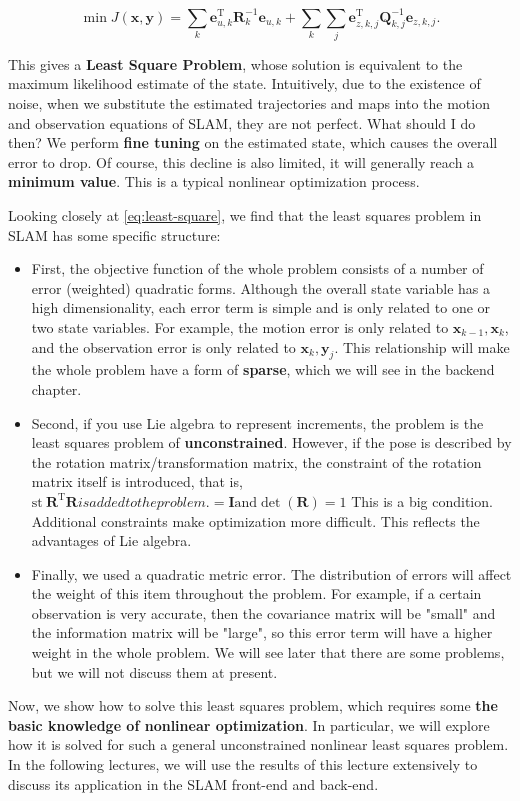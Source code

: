 \begin{equation}
\label{eq:least-square}
\min J (\bm{x},\bm{y}) = \sum\limits_k {\bm{e}_{u,k}^\mathrm{T} \bm{R}_k^{ - 1}{ \bm{e}_{u,k}}}  + \sum\limits_k {\sum\limits_j {\bm{e}_{z,k,j}^\mathrm{T} \bm{Q}_{k,j}^{ - 1}{\bm{e}_{z,k,j}}} } .
\end{equation}

This gives a \textbf{Least Square Problem}, whose solution is equivalent to the maximum likelihood estimate of the state. Intuitively, due to the existence of noise, when we substitute the estimated trajectories and maps into the motion and observation equations of SLAM, they are not perfect. What should I do then? We perform \textbf{fine tuning} on the estimated state, which causes the overall error to drop. Of course, this decline is also limited, it will generally reach a \textbf {minimum value}. This is a typical nonlinear optimization process.

Looking closely at \eqref{eq:least-square}, we find that the least squares problem in SLAM has some specific structure:

\begin{itemize}
	\item First, the objective function of the whole problem consists of a number of error (weighted) quadratic forms. Although the overall state variable has a high dimensionality, each error term is simple and is only related to one or two state variables. For example, the motion error is only related to $\bm{x}_{k-1}, \bm{x}_k$, and the observation error is only related to $\bm{x}_k, \bm{y}_j$. This relationship will make the whole problem have a form of \textbf{sparse}, which we will see in the backend chapter.
	
	\item Second, if you use Lie algebra to represent increments, the problem is the least squares problem of \textbf{unconstrained}. However, if the pose is described by the rotation matrix/transformation matrix, the constraint of the rotation matrix itself is introduced, that is, $\mathrm{st}\ \bm{R}^\mathrm{T} \bm{R} is added to the problem. =\bm{I} \text{and} \det (\bm{R})=1$ This is a big condition. Additional constraints make optimization more difficult. This reflects the advantages of Lie algebra.
	
	\item Finally, we used a quadratic metric error. The distribution of errors will affect the weight of this item throughout the problem. For example, if a certain observation is very accurate, then the covariance matrix will be "small" and the information matrix will be "large", so this error term will have a higher weight in the whole problem. We will see later that there are some problems, but we will not discuss them at present.
\end{itemize}

Now, we show how to solve this least squares problem, which requires some \textbf{the basic knowledge of nonlinear optimization}. In particular, we will explore how it is solved for such a general unconstrained nonlinear least squares problem. In the following lectures, we will use the results of this lecture extensively to discuss its application in the SLAM front-end and back-end.
